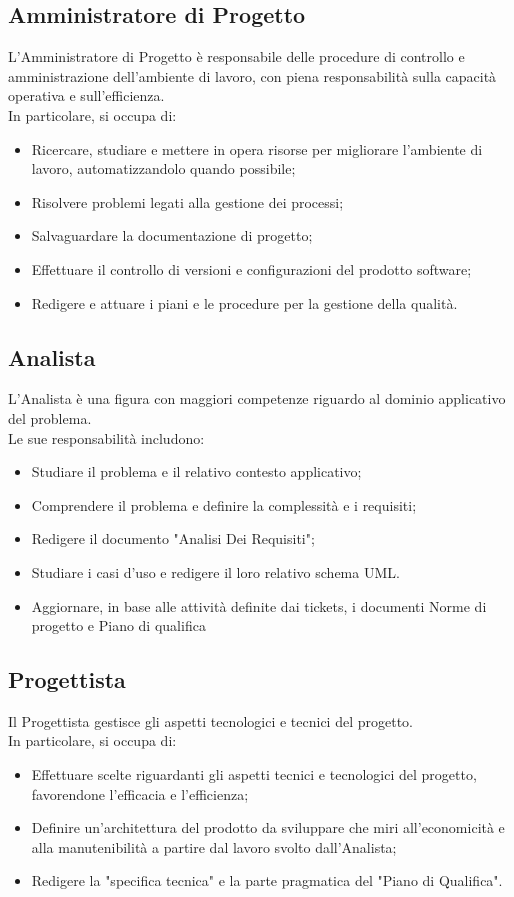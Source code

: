 \subsection{Amministratore di Progetto}
L'Amministratore di Progetto è responsabile delle procedure di controllo e amministrazione dell’ambiente di
lavoro, con piena responsabilità sulla capacità operativa e sull’efficienza.\\
In particolare, si occupa di:
\begin{itemize}
    \item Ricercare, studiare e mettere in opera risorse per migliorare l’ambiente di lavoro, automatizzandolo quando possibile;
    \item Risolvere problemi legati alla gestione dei processi;
    \item Salvaguardare la documentazione di progetto;
    \item Effettuare il controllo di versioni e configurazioni del prodotto software;
    \item Redigere e attuare i piani e le procedure per la gestione della qualità.
\end{itemize}
\subsection{Analista}
L'Analista è una figura con maggiori competenze riguardo al dominio applicativo del problema. \\
Le sue responsabilità includono:
\begin{itemize}
    \item Studiare il problema e il relativo contesto applicativo;
    \item Comprendere il problema e definire la complessità e i requisiti;
    \item Redigere il documento "Analisi Dei Requisiti";
    \item Studiare i casi d'uso e redigere il loro relativo schema UML.
    \item Aggiornare, in base alle attività definite dai tickets, i documenti Norme di progetto e Piano di qualifica
\end{itemize}
\subsection{Progettista}
Il Progettista gestisce gli aspetti tecnologici e tecnici del progetto. \\
In particolare, si occupa di:
\begin{itemize}
    \item Effettuare scelte riguardanti gli aspetti tecnici e tecnologici del progetto, favorendone l'efficacia e l'efficienza;
    \item Definire un'architettura del prodotto da sviluppare che miri all'economicità e alla manutenibilità a partire dal lavoro svolto dall'Analista;
    \item Redigere la "specifica tecnica" e la parte pragmatica del "Piano di Qualifica".
\end{itemize}

